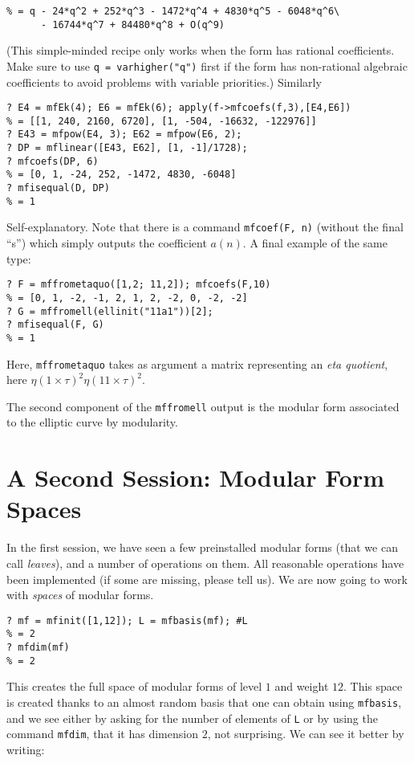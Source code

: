\documentclass[11pt]{article}
\def\kbd#1{{\tt #1}}
\begin{document}
\begin{verbatim}
% = q - 24*q^2 + 252*q^3 - 1472*q^4 + 4830*q^5 - 6048*q^6\
      - 16744*q^7 + 84480*q^8 + O(q^9)
\end{verbatim}
(This simple-minded recipe only works when the form has rational
coefficients. Make sure to use \kbd{q = varhigher("q")} first if the form has
non-rational algebraic coefficients to avoid problems with variable priorities.)
Similarly

\begin{verbatim}
? E4 = mfEk(4); E6 = mfEk(6); apply(f->mfcoefs(f,3),[E4,E6])
% = [[1, 240, 2160, 6720], [1, -504, -16632, -122976]]
? E43 = mfpow(E4, 3); E62 = mfpow(E6, 2);
? DP = mflinear([E43, E62], [1, -1]/1728);
? mfcoefs(DP, 6)
% = [0, 1, -24, 252, -1472, 4830, -6048]
? mfisequal(D, DP)
% = 1
\end{verbatim}

Self-explanatory. Note that there is a command \kbd{mfcoef(F, n)} (without
the final ``s'') which simply outputs the coefficient $a(n)$.
A final example of the same type:

\begin{verbatim}
? F = mffrometaquo([1,2; 11,2]); mfcoefs(F,10)
% = [0, 1, -2, -1, 2, 1, 2, -2, 0, -2, -2]
? G = mffromell(ellinit("11a1"))[2];
? mfisequal(F, G)
% = 1
\end{verbatim}

Here, \kbd{mffrometaquo} takes as argument a matrix representing an
\emph{eta quotient}, here $\eta(1\times\tau)^2\eta(11\times\tau)^2$.

The second component of the \kbd{mffromell} output is the modular form
associated to the elliptic curve by modularity.

\section{A Second Session: Modular Form Spaces}

In the first session, we have seen a few preinstalled modular forms (that
we can call \emph{leaves}), and a number of operations on them. All reasonable
operations have been implemented (if some are missing, please tell us). We are
now going to work with \emph{spaces} of modular forms.

\begin{verbatim}
? mf = mfinit([1,12]); L = mfbasis(mf); #L
% = 2
? mfdim(mf)
% = 2
\end{verbatim}

This creates the full space of modular forms of level $1$ and weight $12$.
This space is created thanks to an almost random basis that one can obtain
using \kbd{mfbasis}, and we see either by asking for the number of elements
of \kbd{L} or by using the command \kbd{mfdim}, that it has dimension $2$,
not surprising. We can see it better by writing:
\end{document}
